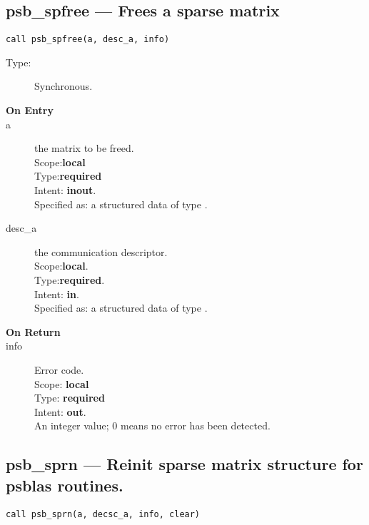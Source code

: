 %
%
\clearpage\subsection*{psb\_spfree --- Frees a sparse matrix}

\begin{verbatim}
call psb_spfree(a, desc_a, info)
\end{verbatim}

\begin{description}
\item[Type:] Synchronous.
\item[\bf On Entry]
\item[a] the matrix to be freed.\\
Scope:{\bf local}\\
Type:{\bf required}\\
Intent: {\bf inout}.\\
Specified as: a structured data of type \spdata.
\item[desc\_a] the communication descriptor.\\
Scope:{\bf local}.\\
Type:{\bf required}.\\
Intent: {\bf in}.\\
Specified as: a structured data of type \descdata.
\end{description}

\begin{description}
\item[\bf On Return]
\item[info] Error code.\\
Scope: {\bf local} \\
Type: {\bf required} \\
Intent: {\bf out}.\\
An integer value; 0 means no error has been detected. 
\end{description}




%
%
\clearpage\subsection*{psb\_sprn --- Reinit sparse matrix structure for psblas
  routines.}

\begin{verbatim}
call psb_sprn(a, decsc_a, info, clear)
\end{verbatim}

